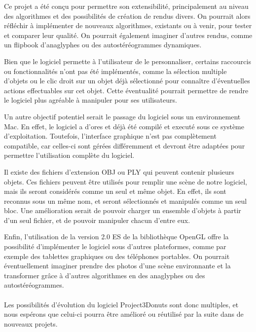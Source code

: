 Ce projet a été conçu pour permettre son extensibilité, principalement au niveau des algorithmes et des possibilités de création de rendus divers. On pourrait alors réfléchir à implémenter de nouveaux algorithmes, existants ou à venir, pour tester et comparer leur qualité. On pourrait également imaginer d'autres rendus, comme un flipbook d'anaglyphes ou des autostéréogrammes dynamiques.

Bien que le logiciel permette à l'utilisateur de le personnaliser, certains raccourcis ou fonctionnalités n'ont pas été implémentés, comme la sélection multiple d'objets ou le clic droit sur un objet déjà sélectionné pour connaître d'éventuelles actions effectuables sur cet objet. Cette éventualité pourrait permettre de rendre le logiciel plus agréable à manipuler pour ses utilisateurs.

Un autre objectif potentiel serait le passage du logiciel sous un environnement Mac. En effet, le logiciel a d'ores et déjà été compilé et executé sous ce système d'exploitation. Toutefois, l'interface graphique n'est pas complètement compatible, car celles-ci sont gérées différemment et devront être adaptées pour permettre l'utilisation complète du logiciel.

Il existe des fichiers d'extension OBJ ou PLY qui peuvent contenir plusieurs objets. Ces fichiers peuvent être utilisés pour remplir une scène de notre logiciel, mais ils seront considérés comme un seul et même objet. En effet, ils sont reconnus sous un même nom, et seront sélectionnés et manipulés comme un seul bloc. Une amélioration serait de pouvoir charger un ensemble d'objets à partir d'un seul fichier, et de pouvoir manipuler chacun d'entre eux.

Enfin, l'utilisation de la version 2.0 ES de la bibliothèque OpenGL offre la possibilité d'implémenter le logiciel sous d'autres plateformes, comme par exemple des tablettes graphiques ou des téléphones portables. On pourrait éventuellement imaginer prendre des photos d'une scène environnante et la transformer grâce à d'autres algorithmes en des anaglyphes ou des autostéréogrammes. 

\paragraph{}
Les possibilités d'évolution du logiciel Project3Donuts sont donc multiples, et nous espérons que celui-ci pourra être amélioré ou réutilisé par la suite dans de nouveaux projets.
